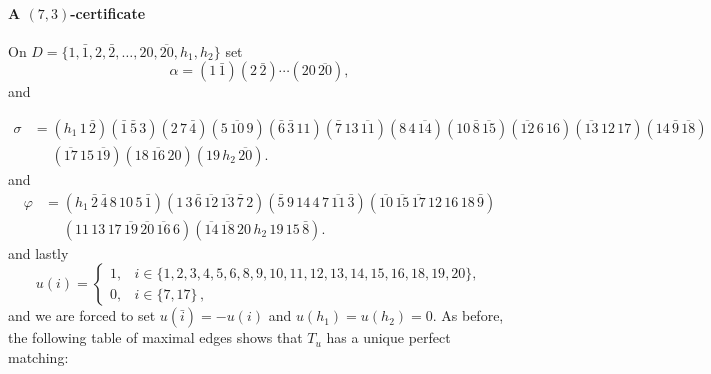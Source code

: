 \documentclass[11pt]{article}
\theoremstyle{remark}
\begin{document}
\paragraph{A $(7,3)$-certificate} On $D=\{1,\bar 1,2,\bar 2,\ldots,20,\overline{20},h_1,h_2\}$ set
\[
\alpha=(1\,\bar1)(2\,\bar2)\cdots(20\,\overline{20}),
\]
and

\begin{equation}
\begin{aligned}
\sigma&=
(h_1\,1\,\bar2)
(\bar1\,\bar5\,3)
(2\,7\,\bar4)
(5\,\overline{10}\,9)
(\bar6\,\bar3\,11)
(\bar7\,13\,\overline{11})
(8\,4\,\overline{14})
(10\,\bar8\,\overline{15})
(\overline{12}\,6\,16)
(\overline{13}\,12\,17)
(14\,\bar9\,\overline{18})
\\
&\,\,\quad
(\overline{17}\,15\,\overline{19})
(18\,\overline{16}\,20)
(19\,h_2\,\overline{20}).
\end{aligned}
\label{eq:C73}
\end{equation}
and
\[
\begin{aligned}
\varphi&=
(h_1\,\bar2\,\bar4\,8\,10\,5\,\bar1)
(1\,3\,\bar6\,\overline{12}\,\overline{13}\,\bar7\,2)
(\bar5\,9\,14\,4\,7\,\overline{11}\,\bar3)
(\overline{10}\,\overline{15}\,\overline{17}\,
  12\,16\,18\,\bar9)
\\
&\,\,\quad
(11\,13\,17\,\overline{19}\,\overline{20}\,
  \overline{16}\,6)
(\overline{14}\,\overline{18}\,20\,h_2\,
  19\,15\,\bar8).
\end{aligned}
\]
and lastly
\[
u(i)=
\begin{cases}
1,
&i\in
\{1,2,3,4,5,6,8,9,10,11,12,13,14,15,16,18,19,20\},\\
0,
&i\in
\{7,17\} \, ,
\end{cases}
\]
and we are forced to set $u(\bar i)=-u(i)$ and $u(h_1)=u(h_2)=0$. As before, the following table of maximal edges shows that $T_u$ has a unique perfect matching:
\end{document}
